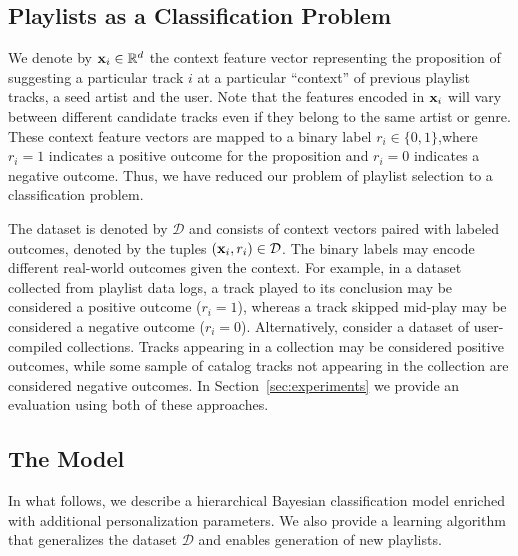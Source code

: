 

\subsection{Playlists as a Classification Problem}
\label{sec:playlist_is_classification}
We denote by $\mathbf{x}_i \in \mathbb{R}^d$ the context feature vector representing the proposition of suggesting a particular track $i$ at a particular ``context'' of previous playlist tracks, a seed artist and the user. Note that the features encoded in $\mathbf{x}_i$  will vary between different candidate tracks even if they belong to the same artist or genre.  These context feature vectors are mapped to a binary label $r_i \in \{0,1\}$,where $r_i=1$ indicates a positive outcome for the proposition and $r_i=0$ indicates a negative outcome. Thus, we have reduced our problem of playlist selection to a classification problem.

The dataset is denoted by $\mathcal{D}$ and consists of context vectors paired with labeled outcomes, denoted by the tuples $\left(\mathbf{x}_i,r_i\right) \in \mathcal{D}$.
The binary labels may encode different real-world outcomes  given the context. 
For example, in a dataset collected from playlist data logs, a track  played to its conclusion may be considered a positive outcome ($r_i=1$), whereas a track  skipped  mid-play may be considered a negative outcome ($r_i=0$). Alternatively, consider a dataset of user-compiled collections. Tracks appearing in a collection may be considered positive outcomes, while some sample of catalog tracks not appearing in the collection are considered negative outcomes.  In Section~\ref{sec:experiments} we provide an evaluation using both of these approaches. 


\subsection{The Model}
In what follows, we describe a  hierarchical Bayesian classification model enriched with additional personalization parameters. We also provide a learning algorithm that generalizes the dataset $\mathcal{D}$ and enables generation of new playlists.

